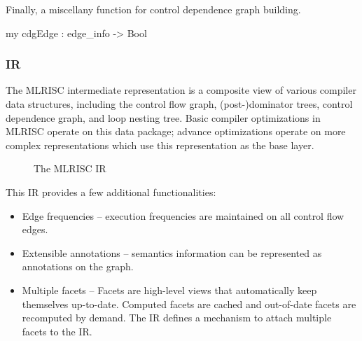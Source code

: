    Finally, a miscellany function for control dependence graph building.
\begin{SML} 
   my cdgEdge : edge_info -> Bool
\end{SML}

\subsubsection{IR}
The MLRISC intermediate representation is a composite
view of various compiler data structures, including the control
flow graph, (post-)dominator trees, control dependence graph, and
loop nesting tree.   Basic compiler optimizations in MLRISC
operate on this data package; advance optimizations
operate on more complex representations which use this
representation as the base layer.  
\begin{wrapfigure}{r}{4.5in}
   \begin{Boxit}
   \end{Boxit}
   \caption{The MLRISC IR}
\end{wrapfigure}

This IR provides a few additional functionalities:
\begin{itemize}
  \item Edge frequencies -- execution frequencies
are maintained on all control flow edges.
  \item Extensible annotations -- semantics information can be 
       represented as annotations on the graph. 
  \item Multiple facets -- 
   Facets are high-level views that automatically keep themselves
up-to-date.  Computed facets are cached and out-of-date facets 
are recomputed by demand.
The IR defines a mechanism to attach multiple facets to the IR.
\end{itemize}

